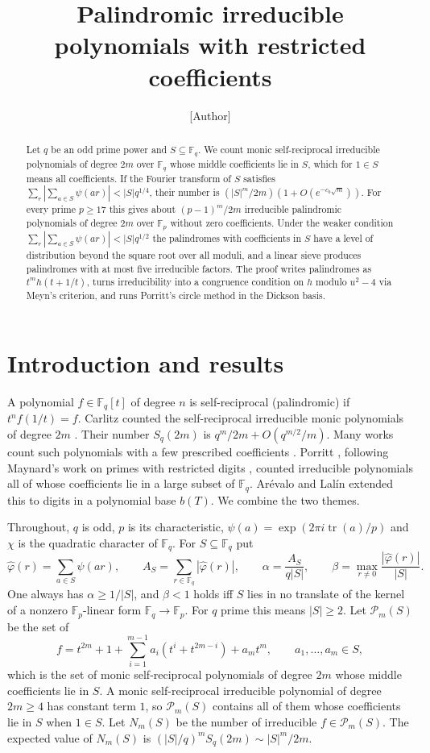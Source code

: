 \documentclass[11pt]{amsart}
\title{Palindromic irreducible polynomials with restricted coefficients}
\author{[Author]}
\date{}
\theoremstyle{definition}
\newcommand{\F}{\mathbb{F}}
\newcommand{\cP}{\mathcal{P}}
\newcommand{\tr}{\operatorname{tr}}
\begin{document}
\begin{abstract}
Let $q$ be an odd prime power and $S\subseteq\F_q$. We count monic self-reciprocal irreducible polynomials of degree $2m$ over $\F_q$ whose middle coefficients lie in $S$, which for $1\in S$ means all coefficients. If the Fourier transform of $S$ satisfies $\sum_{r}|\sum_{a\in S}\psi(ar)|<|S|q^{1/4}$, their number is $(|S|^m/2m)(1+O(e^{-c_0\sqrt m}))$. For every prime $p\ge 17$ this gives about $(p-1)^m/2m$ irreducible palindromic polynomials of degree $2m$ over $\F_p$ without zero coefficients. Under the weaker condition $\sum_r|\sum_{a\in S}\psi(ar)|<|S|q^{1/2}$ the palindromes with coefficients in $S$ have a level of distribution beyond the square root over all moduli, and a linear sieve produces palindromes with at most five irreducible factors. The proof writes palindromes as $t^m h(t+1/t)$, turns irreducibility into a congruence condition on $h$ modulo $u^2-4$ via Meyn's criterion, and runs Porritt's circle method in the Dickson basis.
\end{abstract}

\maketitle

\section{Introduction and results}

A polynomial $f\in\F_q[t]$ of degree $n$ is self-reciprocal (palindromic) if $t^n f(1/t)=f$. Carlitz counted the self-reciprocal irreducible monic polynomials of degree $2m$ \cite{Carlitz}. Their number $S_q(2m)$ is $q^m/2m+O(q^{m/2}/m)$. Many works count such polynomials with a few prescribed coefficients \cite{Garefalakis,GarefalakisKapetanakis,Gao}. Porritt \cite{Porritt}, following Maynard's work on primes with restricted digits \cite{Maynard}, counted irreducible polynomials all of whose coefficients lie in a large subset of $\F_q$. Ar\'evalo and Lal\'in \cite{ArevaloLalin} extended this to digits in a polynomial base $b(T)$. We combine the two themes.

Throughout, $q$ is odd, $p$ is its characteristic, $\psi(a)=\exp(2\pi i\tr(a)/p)$ and $\chi$ is the quadratic character of $\F_q$. For $S\subseteq\F_q$ put
\[
\hat\varphi(r)=\sum_{a\in S}\psi(ar),\qquad A_S=\sum_{r\in\F_q}|\hat\varphi(r)|,\qquad \alpha=\frac{A_S}{q|S|},\qquad \beta=\max_{r\ne0}\frac{|\hat\varphi(r)|}{|S|}.
\]
One always has $\alpha\ge 1/|S|$, and $\beta<1$ holds iff $S$ lies in no translate of the kernel of a nonzero $\F_p$-linear form $\F_q\to\F_p$. For $q$ prime this means $|S|\ge2$. Let $\cP_m(S)$ be the set of
\[
f=t^{2m}+1+\sum_{i=1}^{m-1}a_i(t^i+t^{2m-i})+a_mt^m,\qquad a_1,\dots,a_m\in S,
\]
which is the set of monic self-reciprocal polynomials of degree $2m$ whose middle coefficients lie in $S$. A monic self-reciprocal irreducible polynomial of degree $2m\ge4$ has constant term $1$, so $\cP_m(S)$ contains all of them whose coefficients lie in $S$ when $1\in S$. Let $N_m(S)$ be the number of irreducible $f\in\cP_m(S)$. The expected value of $N_m(S)$ is $(|S|/q)^mS_q(2m)\sim|S|^m/2m$.
\end{document}
